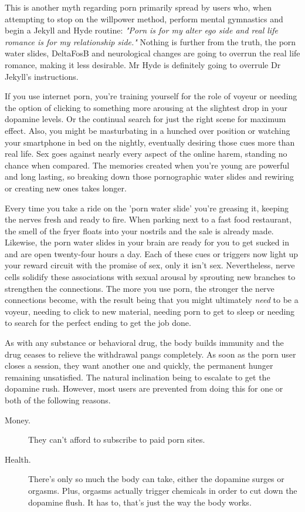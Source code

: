 \documentclass[easypeasy.tex]{subfiles}
\begin{document}
This is another myth regarding porn primarily spread by users who, when attempting to stop on the willpower method, perform mental gymnastics and begin a Jekyll and Hyde routine: \textit{"Porn is for my alter ego side and real life romance is for my relationship side."} Nothing is further from the truth, the porn water slides, DeltaFosB and neurological changes are going to overrun the real life romance, making it less desirable. Mr Hyde is definitely going to overrule Dr Jekyll's instructions.

If you use internet porn, you're training yourself for the role of voyeur or needing the option of clicking to something more arousing at the slightest drop in your dopamine levels. Or the continual search for just the right scene for maximum effect. Also, you might be masturbating in a hunched over position or watching your smartphone in bed on the nightly, eventually desiring those cues more than real life. Sex goes against nearly every aspect of the online harem, standing no chance when compared. The memories created when you're young are powerful and long lasting, so breaking down those pornographic water slides and rewiring or creating new ones takes longer.

Every time you take a ride on the 'porn water slide' you're greasing it, keeping the nerves fresh and ready to fire. When parking next to a fast food restaurant, the smell of the fryer floats into your nostrils and the sale is already made. Likewise, the porn water slides in your brain are ready for you to get sucked in and are open twenty-four hours a day. Each of these cues or triggers now light up your reward circuit with the promise of sex, only it isn't sex. Nevertheless, nerve cells solidify these associations with sexual arousal by sprouting new branches to strengthen the connections. The more you use porn, the stronger the nerve connections become, with the result being that you might ultimately \textit{need} to be a voyeur, needing to click to new material, needing porn to get to sleep or needing to search for the perfect ending to get the job done.

As with any substance or behavioral drug, the body builds immunity and the drug ceases to relieve the withdrawal pangs completely. As soon as the porn user closes a session, they want another one and quickly, the permanent hunger remaining unsatisfied. The natural inclination being to escalate to get the dopamine rush. However, most users are prevented from doing this for one or both of the following reasons.
  \begin{description}
    \item [Money.] They can't afford to subscribe to paid porn sites.
    \item [Health.] There's only so much the body can take, either the dopamine surges or orgasms. Plus, orgasms actually trigger chemicals in order to cut down the dopamine flush. It has to, that's just the way the body works.
  \end{description}
\end{document}
